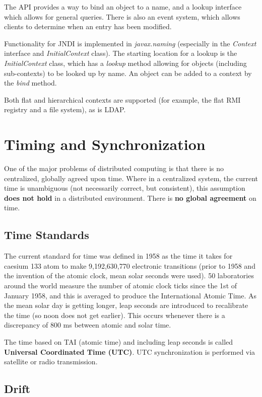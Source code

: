 \documentclass{article}
\begin{document}
The API provides a way to bind an object to a name, and a lookup interface which allows for general queries. There is also an event system, which allows clients to determine when an entry has been modified.

Functionality for JNDI is implemented in \textit{javax.naming} (especially in the \textit{Context} interface and \textit{InitialContext} class). The starting location for a lookup is the \textit{InitialContext} class, which has a \textit{lookup} method allowing for objects (including sub-contexts) to be looked up by name. An object can be added to a context by the \textit{bind} method. 

Both flat and hierarchical contexts are supported (for example, the flat RMI registry and a file system), as is LDAP.

\section{Timing and Synchronization}

One of the major problems of distributed computing is that there is no centralized, globally agreed upon time. Where in a centralized system, the current time is unambiguous (not necessarily correct, but consistent), this assumption \textbf{does not hold} in a distributed environment. There is \textbf{no global agreement} on time.

\subsection{Time Standards}

The current standard for time was defined in 1958 as the time it takes for caesium 133 atom to make 9,192,630,770 electronic transitions (prior to 1958 and the invention of the atomic clock, mean solar seconds were used). 50 laboratories around the world measure the number of atomic clock ticks since the 1st of January 1958, and this is averaged to produce the International Atomic Time. As the mean solar day is getting longer, leap seconds are introduced to recalibrate the time (so noon does not get earlier). This occurs whenever there is a discrepancy of 800 ms between atomic and solar time.

The time based on TAI (atomic time) and including leap seconds is called \textbf{Universal Coordinated Time (UTC)}. UTC synchronization is performed via satellite or radio transmission.

\subsection{Drift}
\end{document}
